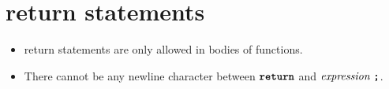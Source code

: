 \section*{\textrm{return} statements}

\begin{itemize}
\item \textrm{return} statements are only allowed in bodies of functions.
\item There cannot be any newline character between
$\textbf{\texttt{return}}$ and $ \textit{expression} \
\textbf{\texttt{;}}$.
\end{itemize}
